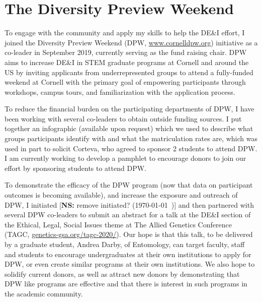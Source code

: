\documentclass[11pt]{article}
\newcommand{\nicholas}[1]{{\color{nicholasCol} [\textbf{NS:} #1 (\today\ \currenttime)]}}
\begin{document}

\section{The Diversity Preview Weekend}

To engage with the community and apply my skills to help the DE\&I effort, I joined the Diversity Preview Weekend (DPW, \href{www.cornelldpw.org}{www.cornelldpw.org}) initiative as a co-leader in September 2019, currently serving as the fund raising chair. DPW aims to increase DE\&I in STEM graduate programs at Cornell and around the US by inviting applicants from underrepresented groups to attend a fully-funded weekend at Cornell with the primary goal of empowering participants through workshops, campus tours, and familiarization with the application process. 

To reduce the financial burden on the participating departments of DPW, I have been working with several co-leaders to obtain outside funding sources. I put together an infographic (available upon request) which we used to describe what groups participants identify with and what the matriculation rates are, which was used in part to solicit Corteva, who agreed to sponsor 2 students to attend DPW. I am currently working to develop a pamphlet to encourage donors to join our effort by sponsoring students to attend DPW. 

To demonstrate the efficacy of the DPW program (now that data on participant outcomes is becoming available), and increase the exposure and outreach of DPW, I initiated \nicholas{remove initiated?} and then partnered with several DPW co-leaders to submit an abstract for a talk at the DE\&I section of the Ethical, Legal, Social Issues theme at The Allied Genetics Conference (TAGC, \href{genetics-gsa.org/tagc-2020/}{genetics-gsa.org/tagc-2020/}). Our hope is that this talk, to be delivered by a graduate student, Andrea Darby, of Entomology, can target faculty, staff and students to encourage undergraduates at their own institutions to apply for DPW, or even create similar programs at their own institutions. We also hope to solidify current donors, as well as attract new donors by demonstrating that DPW like programs are effective and that there is interest in such programs in the academic community.
\end{document}
